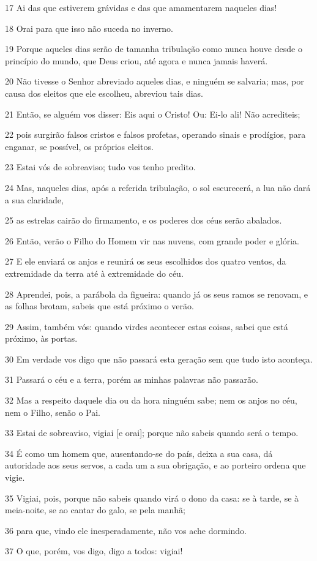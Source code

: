 \par 17 Ai das que estiverem grávidas e das que amamentarem naqueles dias!
\par 18 Orai para que isso não suceda no inverno.
\par 19 Porque aqueles dias serão de tamanha tribulação como nunca houve desde o princípio do mundo, que Deus criou, até agora e nunca jamais haverá.
\par 20 Não tivesse o Senhor abreviado aqueles dias, e ninguém se salvaria; mas, por causa dos eleitos que ele escolheu, abreviou tais dias.
\par 21 Então, se alguém vos disser: Eis aqui o Cristo! Ou: Ei-lo ali! Não acrediteis;
\par 22 pois surgirão falsos cristos e falsos profetas, operando sinais e prodígios, para enganar, se possível, os próprios eleitos.
\par 23 Estai vós de sobreaviso; tudo vos tenho predito.
\par 24 Mas, naqueles dias, após a referida tribulação, o sol escurecerá, a lua não dará a sua claridade,
\par 25 as estrelas cairão do firmamento, e os poderes dos céus serão abalados.
\par 26 Então, verão o Filho do Homem vir nas nuvens, com grande poder e glória.
\par 27 E ele enviará os anjos e reunirá os seus escolhidos dos quatro ventos, da extremidade da terra até à extremidade do céu.
\par 28 Aprendei, pois, a parábola da figueira: quando já os seus ramos se renovam, e as folhas brotam, sabeis que está próximo o verão.
\par 29 Assim, também vós: quando virdes acontecer estas coisas, sabei que está próximo, às portas.
\par 30 Em verdade vos digo que não passará esta geração sem que tudo isto aconteça.
\par 31 Passará o céu e a terra, porém as minhas palavras não passarão.
\par 32 Mas a respeito daquele dia ou da hora ninguém sabe; nem os anjos no céu, nem o Filho, senão o Pai.
\par 33 Estai de sobreaviso, vigiai [e orai]; porque não sabeis quando será o tempo.
\par 34 É como um homem que, ausentando-se do país, deixa a sua casa, dá autoridade aos seus servos, a cada um a sua obrigação, e ao porteiro ordena que vigie.
\par 35 Vigiai, pois, porque não sabeis quando virá o dono da casa: se à tarde, se à meia-noite, se ao cantar do galo, se pela manhã;
\par 36 para que, vindo ele inesperadamente, não vos ache dormindo.
\par 37 O que, porém, vos digo, digo a todos: vigiai!

